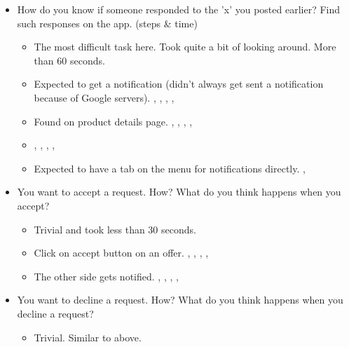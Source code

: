 \begin{itemize}
\begin{itemize}
		\end{itemize}
		\tab
	\item How do you know if someone responded to the 'x' you posted earlier? Find such responses on the app. (steps \& time)
		\begin{itemize}
			\item The most difficult task here. Took quite a bit of looking around. More than 60 seconds.
			\item Expected to get a notification (didn't always get sent a notification because of Google servers). , , , , 
			\item Found on product details page. , , , , 
			\item {} , , , , 
			\item Expected to have a tab on the menu for notifications directly. , 
		\end{itemize}
		\tab
	\item You want to accept a request. How? What do you think happens when you accept?
		\begin{itemize}
			\item Trivial and took less than 30 seconds.
			\item Click on accept button on an offer. , , , , 
			\item The other side gets notified. , , , , 
		\end{itemize}
		\tab
	\item You want to decline a request. How? What do you think happens when you decline a request?
		\begin{itemize}
			\item Trivial. Similar to above.
		\end{itemize} 
		\tab 
		

\end{itemize}
